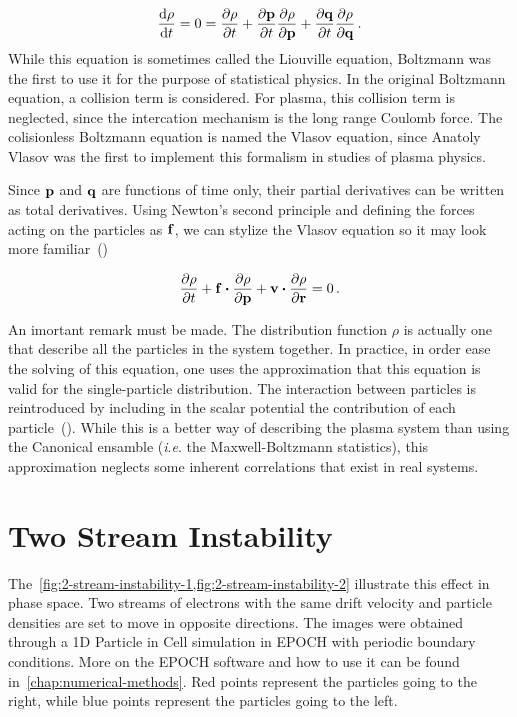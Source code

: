 \documentclass[12pt, class=report, crop=false]{standalone}
\begin{document}
\begin{equation}
  \dv{\rho}{t} = 0 = \pdv{\rho}{t} + \pdv{\vb{p}}{t} \pdv{\rho}{\vb{p}} + \pdv{\vb{q}}{t} \pdv{\rho}{\vb{q}} \,.
\end{equation}
While this equation is sometimes called the Liouville equation, Boltzmann was the first to use it for the purpose of statistical physics. In the original Boltzmann equation, a collision term is considered. For plasma, this collision term is neglected, since the intercation mechanism is the long range Coulomb force. The colisionless Boltzmann equation is named the Vlasov equation, since Anatoly Vlasov was the first to implement this formalism in studies of plasma physics.

Since \(\vb{p}\) and \(\vb{q}\) are functions of time only, their partial derivatives can be written as total derivatives. Using Newton's second principle and defining the forces acting on the particles as \(\vb{f}\), we can stylize the Vlasov equation so it may look more familiar~(\cite{feixUniversalModelVlasov2005})

\begin{equation}
  \pdv{\rho}{t} + \vb{f}\vdot\pdv{\rho}{\vb{p}} + \vb{v}\vdot\pdv{\rho}{\vb{r}} = 0\,.
\end{equation}

An imortant remark must be made. The distribution function \(\rho\) is actually one that describe all the particles in the system together. In practice, in order ease the solving of this equation, one uses the approximation that this equation is valid for the single-particle distribution. The interaction between particles is reintroduced by including in the scalar potential the contribution of each particle~(\cite{silimVlasovcodeSimulationsCollisionless2003}). While this is a better way of describing the plasma system than using the Canonical ensamble (\textit{i}.\textit{e}. the Maxwell-Boltzmann statistics), this approximation neglects some inherent correlations that exist in real systems.

\section{Two Stream Instability}


The~\cref{fig:2-stream-instability-1,fig:2-stream-instability-2} illustrate this effect in phase space. Two streams of electrons with the same drift velocity and particle densities are set to move in opposite directions. The images were obtained through a 1D Particle in Cell simulation in EPOCH with periodic boundary conditions. More on the EPOCH software and how to use it can be found in~\cref{chap:numerical-methods}. Red points represent the particles going to the right, while blue points represent the particles going to the left.
\end{document}
